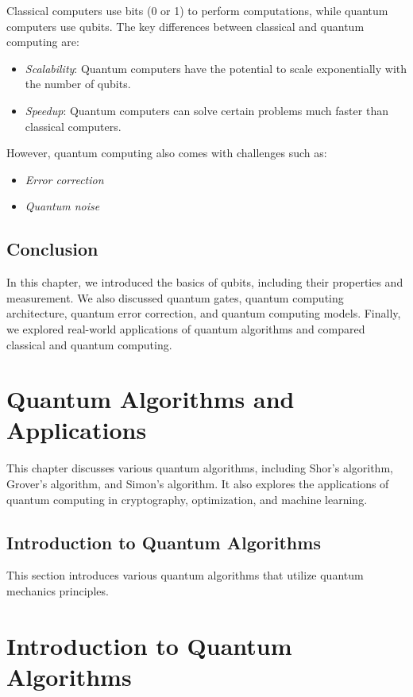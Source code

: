 \documentclass{report}%
\begin{document}
Classical computers use bits (0 or 1) to perform computations, while quantum computers use qubits. The key differences between classical and quantum computing are:

\begin{itemize}
\item \textit{Scalability}: Quantum computers have the potential to scale exponentially with the number of qubits.
\item \textit{Speedup}: Quantum computers can solve certain problems much faster than classical computers.
\end{itemize}

However, quantum computing also comes with challenges such as:

\begin{itemize}
\item \textit{Error correction}
\item \textit{Quantum noise}
\end{itemize}

\section{Conclusion}

In this chapter, we introduced the basics of qubits, including their properties and measurement. We also discussed quantum gates, quantum computing architecture, quantum error correction, and quantum computing models. Finally, we explored real-world applications of quantum algorithms and compared classical and quantum computing.%
\chapter{Quantum Algorithms and Applications}%
This chapter discusses various quantum algorithms, including Shor's algorithm, Grover's algorithm, and Simon's algorithm. It also explores the applications of quantum computing in cryptography, optimization, and machine learning.

%
\section{Introduction to Quantum Algorithms}%
This section introduces various quantum algorithms that utilize quantum mechanics principles.

%
\chapter{Introduction to Quantum Algorithms}
\end{document}
